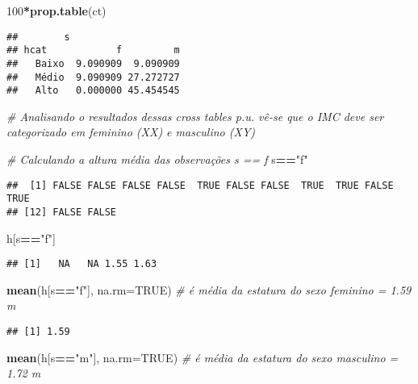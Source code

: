 \documentclass[]{article}
\newenvironment{Shaded}{\begin{snugshade}}{\end{snugshade}}
\newcommand{\KeywordTok}[1]{\textcolor[rgb]{0.13,0.29,0.53}{\textbf{#1}}}
\newcommand{\DataTypeTok}[1]{\textcolor[rgb]{0.13,0.29,0.53}{#1}}
\newcommand{\DecValTok}[1]{\textcolor[rgb]{0.00,0.00,0.81}{#1}}
\newcommand{\StringTok}[1]{\textcolor[rgb]{0.31,0.60,0.02}{#1}}
\newcommand{\CommentTok}[1]{\textcolor[rgb]{0.56,0.35,0.01}{\textit{#1}}}
\newcommand{\OtherTok}[1]{\textcolor[rgb]{0.56,0.35,0.01}{#1}}
\newcommand{\OperatorTok}[1]{\textcolor[rgb]{0.81,0.36,0.00}{\textbf{#1}}}
\newcommand{\NormalTok}[1]{#1}
\begin{document}
\begin{Shaded}
\begin{Highlighting}[]
\DecValTok{100}\OperatorTok{*}\KeywordTok{prop.table}\NormalTok{(ct)}
\end{Highlighting}
\end{Shaded}

\begin{verbatim}
##        s
## hcat            f         m
##   Baixo  9.090909  9.090909
##   Médio  9.090909 27.272727
##   Alto   0.000000 45.454545
\end{verbatim}

\begin{Shaded}
\begin{Highlighting}[]
\CommentTok{# Analisando o resultados dessas cross tables p.u. vê-se que o IMC deve ser categorizado em feminino (XX) e masculino (XY)}

\CommentTok{# Calculando a altura média das observações s == f}
\NormalTok{s}\OperatorTok{==}\StringTok{"f"}
\end{Highlighting}
\end{Shaded}

\begin{verbatim}
##  [1] FALSE FALSE FALSE FALSE  TRUE FALSE FALSE  TRUE  TRUE FALSE  TRUE
## [12] FALSE FALSE
\end{verbatim}

\begin{Shaded}
\begin{Highlighting}[]
\NormalTok{h[s}\OperatorTok{==}\StringTok{"f"}\NormalTok{]}
\end{Highlighting}
\end{Shaded}

\begin{verbatim}
## [1]   NA   NA 1.55 1.63
\end{verbatim}

\begin{Shaded}
\begin{Highlighting}[]
\KeywordTok{mean}\NormalTok{(h[s}\OperatorTok{==}\StringTok{"f"}\NormalTok{], }\DataTypeTok{na.rm=}\OtherTok{TRUE}\NormalTok{) }\CommentTok{# é média da estatura do sexo feminino  = 1.59 m}
\end{Highlighting}
\end{Shaded}

\begin{verbatim}
## [1] 1.59
\end{verbatim}

\begin{Shaded}
\begin{Highlighting}[]
\KeywordTok{mean}\NormalTok{(h[s}\OperatorTok{==}\StringTok{"m"}\NormalTok{], }\DataTypeTok{na.rm=}\OtherTok{TRUE}\NormalTok{) }\CommentTok{# é média da estatura do sexo masculino = 1.72 m}
\end{Highlighting}
\end{Shaded}
\end{document}

